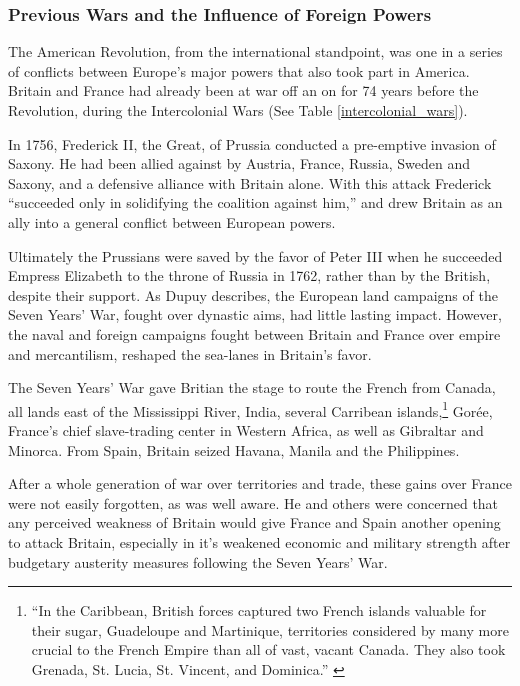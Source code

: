 \subsubsection{Previous Wars and the Influence of Foreign Powers}

The American Revolution, from the international standpoint, was one in a series
of conflicts between Europe's major powers that also took part in America.
Britain and France had already been at war off an on for 74 years before
the Revolution, during the Intercolonial Wars (See Table \ref{intercolonial_wars}).



In 1756, Frederick II, the Great, of Prussia conducted a pre-emptive invasion 
of Saxony. He had been allied against by Austria, France, Russia, Sweden and
Saxony, and a defensive alliance with Britain alone. With this attack Frederick
``succeeded only in solidifying the coalition against
him,''\cite{dupuy_1977} and drew Britain as an ally into a general conflict
between European powers. 

Ultimately the Prussians were saved by the favor of Peter III when he succeeded
Empress Elizabeth to the throne of Russia in 1762, rather than by the British,
despite their support. As Dupuy describes, the European land campaigns of
the Seven Years' War, fought over dynastic aims, had little lasting impact.
However, the naval and foreign campaigns fought between Britain and France over
empire and mercantilism, reshaped the sea-lanes in Britain's favor.

The Seven Years' War gave Britian the stage to route the French from
Canada, all lands east of the Mississippi River, India, several Carribean
islands,\footnote{``In the Caribbean, British forces captured two French islands
valuable for their sugar, Guadeloupe and Martinique, territories considered by
many more crucial to the French Empire than all of vast, vacant Canada. They
also took Grenada, St. Lucia, St. Vincent, and Dominica.'' \cite[8]{dupuy_1977}}
Gor\'ee, France's chief slave-trading center in Western Africa, as well as
Gibraltar and Minorca.\cite[7-9]{dupuy_1977} From Spain, Britain seized Havana,
Manila and the Philippines.

After a whole generation of war over territories and trade, these gains over
France were not easily forgotten, as  was well aware. He and others
were concerned that any perceived weakness of Britain would give France and
Spain another opening to attack Britain, especially in it's weakened economic
and military strength after  budgetary
austerity measures following the Seven Years' War.


